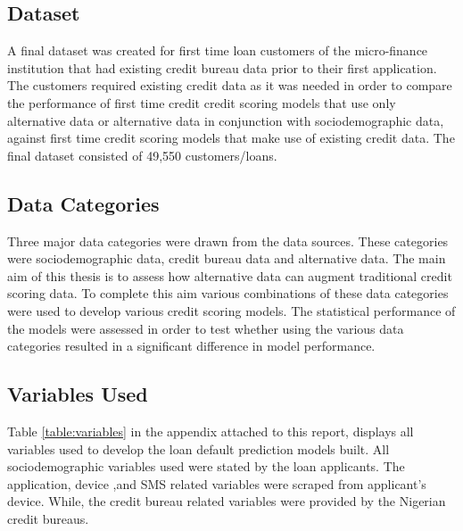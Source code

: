 \subsection{Dataset}

A final dataset was created for first time loan customers of the micro-finance institution that had existing credit bureau data prior to their first application. The customers required existing credit data as it was needed in order to compare the performance of first time credit credit scoring models that use only alternative data or alternative data in conjunction with sociodemographic data, against first time credit scoring models that make use of existing credit data. The final dataset consisted of 49,550 customers/loans. 

\subsection{Data Categories}

Three major data categories were drawn from the data sources. These categories were sociodemographic data, credit bureau data and alternative data. The main aim of this thesis is to assess how alternative data can augment traditional credit scoring data. To complete this aim various combinations of these data categories were used to develop various credit scoring models. The statistical performance of the models were assessed in order to test whether using the various data categories resulted in a significant difference in model performance. 

\subsection{Variables Used}

Table \ref{table:variables} in the appendix attached to this report, displays all variables used to develop the loan default prediction models built. All sociodemographic variables used were stated by the loan applicants. The application, device ,and SMS related variables were scraped from applicant's device. While, the credit bureau related variables were provided by the Nigerian credit bureaus.  \\





